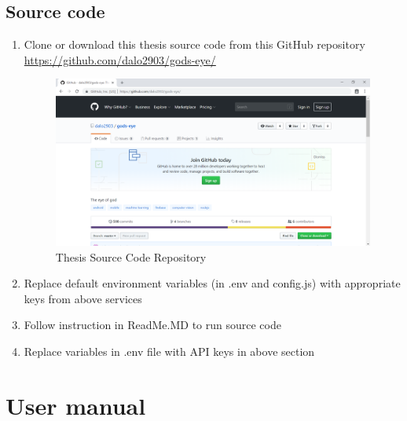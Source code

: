 \section{Source code}
\begin{enumerate}
\item Clone or download this thesis source code from this GitHub repository \href{https://github.com/dalo2903/gods-eye/}{https://github.com/dalo2903/gods-eye/}
\begin{center}
    \begin{figure}[H]
    \centering
    \includegraphics[width=1\columnwidth]{images/appendixA/GodsEye-GitHub.PNG}
    \caption{Thesis Source Code Repository}
    \end{figure}
\end{center}
\item Replace default environment variables (in .env and config.js) with appropriate keys from above services
\item Follow instruction in ReadMe.MD to run source code
\item Replace variables in .env file with API keys in above section
\end{enumerate}

\chapter{User manual}
